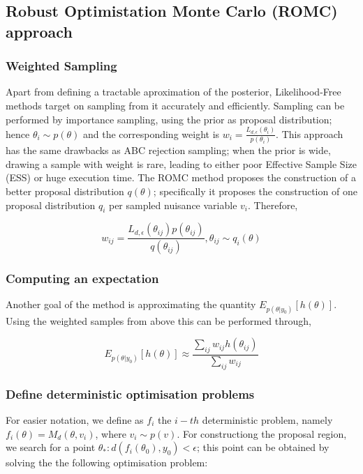 \documentclass[11pt,twoside]{article}
\numberwithin{Theorem}{section}
\numberwithin{Definition}{section}
\numberwithin{Lemma}{section}
\numberwithin{Algorithm}{section}
\numberwithin{equation}{section}
\begin{document}
\subsection{Robust Optimistation Monte Carlo (ROMC) approach}
\label{sec:ROMC}

\subsubsection*{Weighted Sampling}

Apart from defining a tractable aproximation of the posterior, Likelihood-Free methods target on sampling from it accurately and efficiently. Sampling can be performed by importance sampling, using the prior as proposal distribution; hence $\theta_i \sim p(\theta)$ and the corresponding weight is $w_i = \frac{L_{d,\epsilon}(\theta_i)}{p(\theta_i)}$. This approach has the same drawbacks as ABC rejection sampling; when the prior is wide, drawing a sample with weight is rare, leading to either poor Effective Sample Size (ESS) or huge execution time. The ROMC method proposes the construction of a better proposal distribution $q(\theta)$; specifically it proposes the construction of one proposal distribution $q_i$ per sampled nuisance variable $v_i$. Therefore,

\begin{equation} \label{eq:sampling}
  w_{ij} = \frac{L_{d,\epsilon}(\theta_{ij}) p(\theta_{ij})}{q(\theta_{ij})}, \theta_{ij} \sim q_i(\theta)
 \end{equation}


\subsubsection*{Computing an expectation}

Another goal of the method is approximating the quantity $E_{p(\theta|y_0)}[h(\theta)]$. Using the weighted samples from above this can be performed through,

\begin{equation} \label{eq:expectation}
  E_{p(\theta|y_0)}[h(\theta)] \approx \frac{\sum_{ij} w_{ij} h(\theta_{ij})}{\sum_{ij} w_{ij}}
 \end{equation}

 
 \subsubsection{Define deterministic optimisation problems}
 
For easier notation, we define as $f_i$ the $i-th$ deterministic problem, namely $f_i(\theta) = M_d(\theta, v_i)$, where $v_i \sim p(v)$. For constructiong the proposal region, we search for a point $\theta_* : d(f_i(\theta_0), y_0) < \epsilon$; this point can be obtained by solving the the following optimisation problem:
\end{document}
